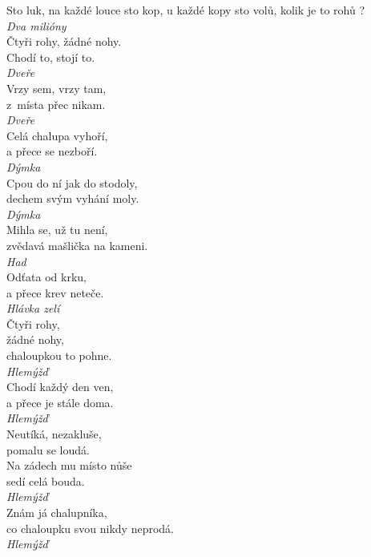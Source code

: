 \begin{multicols}{3}
\noindent
Sto luk, na každé louce sto kop, u každé kopy sto volů, kolik
je to rohů ?\\[1 mm]
{\sl Dva milióny}\\

\noindent
Čtyři rohy, žádné nohy.\\
Chodí to, stojí to.\\[1 mm]
{\sl Dveře}\\

\noindent
Vrzy sem, vrzy tam,\\
z~místa přec nikam.\\[1 mm]
{\sl Dveře}\\

\noindent
Celá chalupa vyhoří,\\
a přece se nezboří.\\[1 mm]
{\sl Dýmka}\\

\noindent
Cpou do ní jak do stodoly,\\
dechem svým vyhání moly.\\[1 mm]
{\sl Dýmka}\\

\noindent
Mihla se, už tu není,\\
zvědavá mašlička na kameni.\\[1 mm]
{\sl Had}\\

\noindent
Odťata od krku,\\
a přece krev neteče.\\[1 mm]
{\sl Hlávka zelí}\\

\noindent
Čtyři rohy,\\
žádné nohy,\\
chaloupkou to pohne.\\[1 mm]
{\sl Hlemýžď}\\

\noindent
Chodí každý den ven,\\
a přece je stále doma.\\[1 mm]
{\sl Hlemýžď}\\

\noindent
Neutíká, nezakluše,\\
pomalu se loudá.\\
Na zádech mu místo nůše\\
sedí celá bouda.\\[1 mm]
{\sl Hlemýžď}\\

\noindent
Znám já chalupníka,\\
co chaloupku svou nikdy neprodá.\\[1 mm]
{\sl Hlemýžď}\\


\end{multicols}

